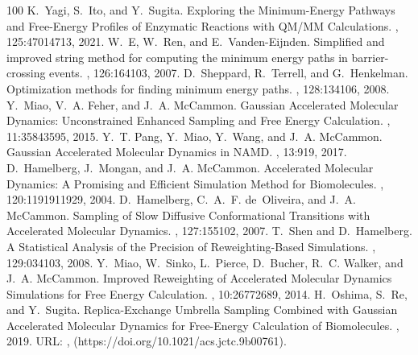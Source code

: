 \documentclass[a4paper,11pt,oneside,english]{sphinxmanual}
\begin{document}
\begin{sphinxthebibliography}{100}
K. Yagi, S. Ito, and Y. Sugita. Exploring the Minimum-Energy Pathways and Free-Energy Profiles of Enzymatic Reactions with QM/MM Calculations. , 125:4701\textendash{}4713, 2021.
W. E, W. Ren, and E. Vanden-Eijnden. Simplified and improved string method for computing the minimum energy paths in barrier-crossing events. , 126:164103, 2007.
D. Sheppard, R. Terrell, and G. Henkelman. Optimization methods for finding minimum energy paths. , 128:134106, 2008.
Y. Miao, V. A. Feher, and J. A. McCammon. Gaussian Accelerated Molecular Dynamics: Unconstrained Enhanced Sampling and Free Energy Calculation. , 11:3584\textendash{}3595, 2015.
Y. T. Pang, Y. Miao, Y. Wang, and J. A. McCammon. Gaussian Accelerated Molecular Dynamics in NAMD. , 13:9\textendash{}19, 2017.
D. Hamelberg, J. Mongan, and J. A. McCammon. Accelerated Molecular Dynamics: A Promising and Efficient Simulation Method for Biomolecules. , 120:11919\textendash{}11929, 2004.
D. Hamelberg, C. A. F. de Oliveira, and J. A. McCammon. Sampling of Slow Diffusive Conformational Transitions with Accelerated Molecular Dynamics. , 127:155102, 2007.
T. Shen and D. Hamelberg. A Statistical Analysis of the Precision of Reweighting-Based Simulations. , 129:034103, 2008.
Y. Miao, W. Sinko, L. Pierce, D. Bucher, R. C. Walker, and J. A. McCammon. Improved Reweighting of Accelerated Molecular Dynamics Simulations for Free Energy Calculation. , 10:2677\textendash{}2689, 2014.
H. Oshima, S. Re, and Y. Sugita. Replica-Exchange Umbrella Sampling Combined with Gaussian Accelerated Molecular Dynamics for Free-Energy Calculation of Biomolecules. , 2019. URL: ,  (https://doi.org/10.1021/acs.jctc.9b00761).

\end{sphinxthebibliography}
\end{document}
